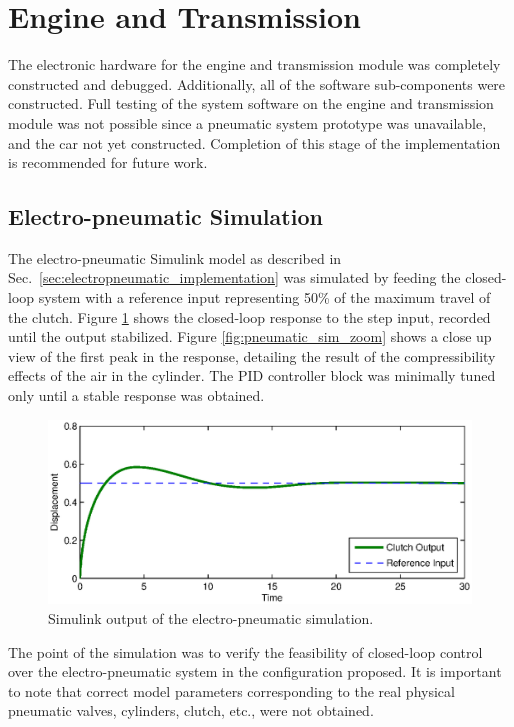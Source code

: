 \section{Engine and Transmission}

The electronic hardware for the engine and transmission module was completely constructed and debugged. Additionally, all of the software sub-components were constructed. Full testing of the system software on the engine and transmission module was not possible since a pneumatic system prototype was unavailable, and the car not yet constructed. Completion of this stage of the implementation is recommended for future work.

\subsection{Electro-pneumatic Simulation}

The electro-pneumatic Simulink model as described in Sec.\ \ref{sec:electropneumatic_implementation} was simulated by feeding the closed-loop system with a reference input representing 50\% of the maximum travel of the clutch. Figure \ref{fig:pneumatic_sim} shows the closed-loop response to the step input, recorded until the output stabilized. Figure \ref{fig:pneumatic_sim_zoom} shows a close up view of the first peak in the response, detailing the result of the compressibility effects of the air in the cylinder. The PID controller block was minimally tuned only until a stable response was obtained.

\begin{figure}[H]
 \centering
 \includegraphics[width=5in,keepaspectratio]{results/figures/electro-pneumatic_simulation_plot.eps}
 \caption{Simulink output of the electro-pneumatic simulation.}
 \label{fig:pneumatic_sim}
\end{figure}

The point of the simulation was to verify the feasibility of closed-loop control over the electro-pneumatic system in the configuration proposed. It is important to note that correct model parameters corresponding to the real physical pneumatic valves, cylinders, clutch, etc., were not obtained.

